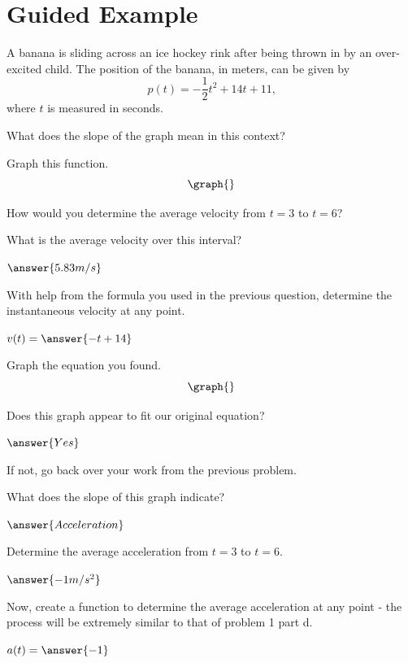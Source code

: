 \documentclass{ximera}
\begin{document}
\section{Guided Example}
\begin{question}
A banana is sliding across an ice hockey rink after being thrown in by an over-excited child. The position of the banana, in meters, can be given by $$p(t) = -\dfrac{1}{2}t^2+14t+11\text{,}$$ where $t$ is measured in seconds.

What does the slope of the graph mean in this context?
\begin{multipleChoice}
\end{multipleChoice}

Graph this function.
\[
    \graph{}
\]

How would you determine the average velocity from $t = 3$ to $t = 6$?

\begin{multipleChoice}
\end{multipleChoice}


What is the average velocity over this interval?

$\answer{5.83 m/s}$

With help from the formula you used in the previous question, determine the instantaneous velocity at any point.

$v(t) =  \answer{-t+14}$


Graph the equation you found.
\[
    \graph{}
\]

Does this graph appear to fit our original equation?

$\answer{Yes}$

If not, go back over your work from the previous problem.


What does the slope of this graph indicate?

$\answer{Acceleration}$

Determine the average acceleration from $t = 3$ to $t = 6$.

$\answer{-1 m/s^2}$

Now, create a function to determine the average acceleration at any point - the process will be extremely similar to that of problem 1 part d.

$a(t) = \answer{-1}$
\end{question}
\end{document}
